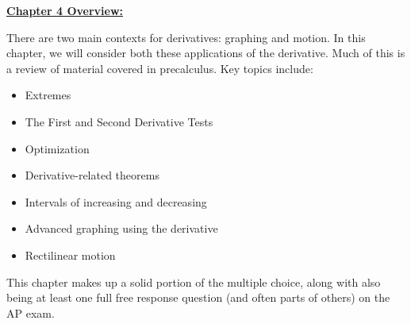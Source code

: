 \textbf{\underline{\large{Chapter 4 Overview: }}} \par

There are two main contexts for derivatives: graphing and motion. In this chapter, we will consider both these applications of the derivative. Much of this is a review of material covered in precalculus. Key topics include: \begin{itemize}
    \item Extremes
    \item The First and Second Derivative Tests
    \item Optimization
    \item Derivative-related theorems
    \item Intervals of increasing and decreasing
    \item Advanced graphing using the derivative
    \item Rectilinear motion
\end{itemize}

This chapter makes up a solid portion of the multiple choice, along with also being at least one full free response question (and often parts of others) on the AP exam.
